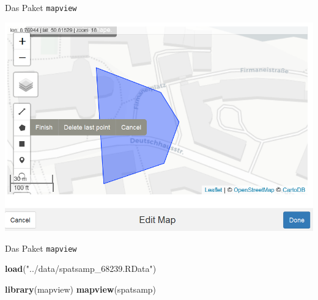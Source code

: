 \documentclass[ignorenonframetext,]{beamer}
\newenvironment{Shaded}{\begin{snugshade}}{\end{snugshade}}
\newcommand{\KeywordTok}[1]{\textcolor[rgb]{0.13,0.29,0.53}{\textbf{#1}}}
\newcommand{\NormalTok}[1]{#1}
\newcommand{\OperatorTok}[1]{\textcolor[rgb]{0.81,0.36,0.00}{\textbf{#1}}}
\newcommand{\StringTok}[1]{\textcolor[rgb]{0.31,0.60,0.02}{#1}}
\begin{document}
\begin{frame}[fragile]{Das Paket \texttt{mapview}}
\protect\hypertarget{das-paket-mapview}{}

\begin{Shaded}
\end{Shaded}

\includegraphics{figure/editmap.PNG}

\end{frame}

\begin{frame}[fragile]{Das Paket \texttt{mapview}}
\protect\hypertarget{das-paket-mapview-1}{}

\begin{Shaded}
\begin{Highlighting}[]
\KeywordTok{load}\NormalTok{(}\StringTok{"../data/spatsamp_68239.RData"}\NormalTok{)}
\end{Highlighting}
\end{Shaded}

\begin{Shaded}
\begin{Highlighting}[]
\KeywordTok{library}\NormalTok{(mapview)}
\KeywordTok{mapview}\NormalTok{(spatsamp)}
\end{Highlighting}
\end{Shaded}

\end{frame}
\end{document}

